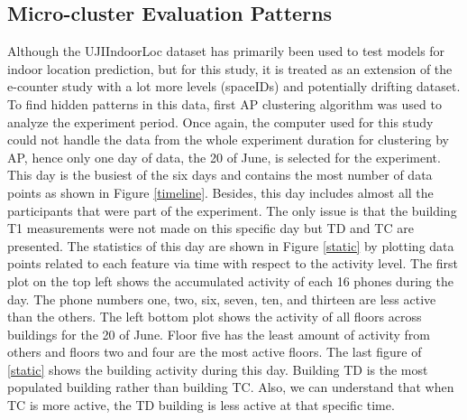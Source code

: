 


\subsection{Micro-cluster Evaluation Patterns}
Although the UJIIndoorLoc dataset has primarily been used to test models for indoor location prediction, but for this study, it is treated as an extension of the e-counter study with a lot more levels (spaceIDs) and potentially drifting dataset. To find hidden patterns in this data, first AP clustering algorithm was used to analyze the experiment period. Once again, the computer used for this study could not handle the data from the whole experiment duration for clustering by AP, hence only one day of data, the 20 of June, is selected for the experiment. This day is the busiest of the six days and contains the most number of data points as shown in Figure \ref{timeline}. Besides, this day includes almost all the participants that were part of the experiment. The only issue is that the building T1 measurements were not made on this specific day but TD and TC are presented. The statistics of this day are shown in Figure \ref{static} by plotting data points related to each feature via time with respect to the activity level. The first plot on the top left shows the accumulated activity of each 16 phones during the day. The phone numbers one, two, six, seven, ten, and thirteen are less active than the others. The left bottom plot shows the activity of all floors across buildings for the 20 of June. Floor five has the least amount of activity from others and floors two and four are the most active floors. The last figure of \ref{static} shows the building activity during this day. Building TD is the most populated building rather than building TC. Also, we can understand that when TC is more active, the TD building is less active at that specific time.


